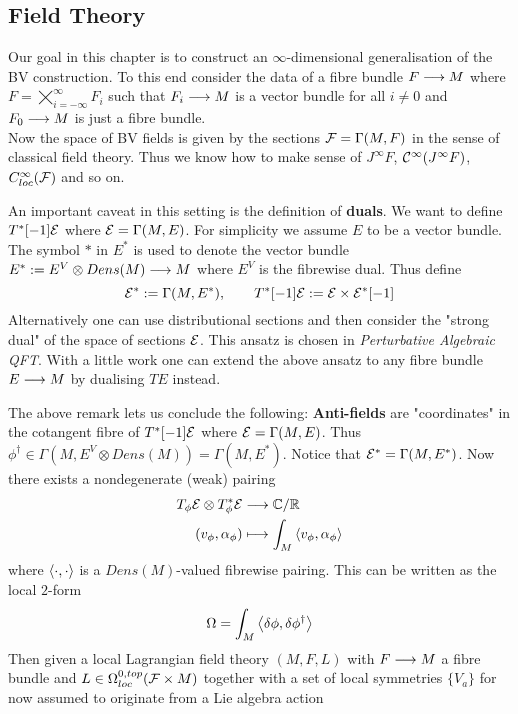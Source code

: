 \newpage
\subsection{Field Theory}
Our goal in this chapter is to construct an $\infty$-dimensional generalisation of the BV construction. To this end consider the data of a fibre bundle $F \longrightarrow M$ where $F = \bigtimes_{i = - \infty}^{\infty} F_i$ such that $F_i \longrightarrow M$ is a vector bundle for all $i \neq 0$ and $F_0 \longrightarrow M$ is just a fibre bundle.\\
Now the space of BV fields is given by the sections ${\mathcal{F}} = \Gamma(M, F)$ in the sense of classical field theory. Thus we know how to make sense of $J^\infty F$, $\mathcal{C}^{\infty}(J^\infty F)$, $C_{loc}^\infty({\mathcal{F}})$ and so on.

\begin{rem}
  An important caveat in this setting is the definition of \textbf{duals}. We want to define $T^*[-1] {\mathcal{E}}$ where ${\mathcal{E}} = \Gamma(M, E)$. For simplicity we assume $E$ to be a vector bundle. The symbol $*$ in $E^*$ is used to denote the vector bundle $E^* := E^V \otimes Dens(M) \longrightarrow M$ where $E^V$ is the fibrewise dual. Thus define
  \begin{equation}
    {\mathcal{E}}^* := \Gamma(M, E^*), \quad \quad T^*[-1]{\mathcal{E}} := {\mathcal{E}} \times {\mathcal{E}}^*[-1]
  \end{equation}
  Alternatively one can use distributional sections and then consider the "strong dual" of the space of sections ${\mathcal{E}}$. This ansatz is chosen in \emph{Perturbative Algebraic QFT}. With a little work one can extend the above ansatz to any fibre bundle $E \longrightarrow M$ by dualising $TE$ instead.
\end{rem}

The above remark lets us conclude the following: \textbf{Anti-fields} are "coordinates" in the cotangent fibre of $T^*[-1]{\mathcal{E}}$ where ${\mathcal{E}} = \Gamma(M, E)$. Thus $\phi^\dagger \in \Gamma(M, E^V \otimes Dens(M)) = \Gamma(M, E^*)$. Notice that ${\mathcal{E}}^* = \Gamma(M, E^*)$. Now there exists a nondegenerate (weak) pairing
\begin{align}
  T_\phi \EE \otimes T^*_\phi \EE &\lra \CC/\RR \\
  (v_\phi, \alpha_\phi) &\lmap \int_M \pair{v_\phi}{\alpha_\phi}
\end{align}
where $\left\langle \cdot , \cdot \right\rangle$ is a $Dens(M)$-valued fibrewise pairing. This can be written as the local $2$-form
\begin{equation}
  \Omega = \int_M \pair{\delta \phi}{\delta \phi^\dagger}
\end{equation}
Then given a local Lagrangian field theory $(M, F, L)$ with $F \longrightarrow M$ a fibre bundle and $L \in \Omega_{loc}^{0,top}({\mathcal{F}} \times M)$ together with a set of local symmetries $\{V_a\}$ for now assumed to originate from a Lie algebra action


